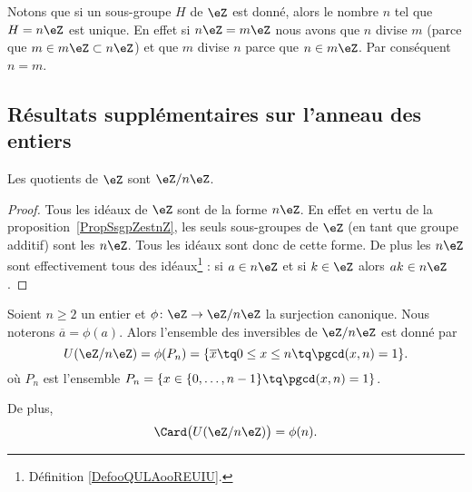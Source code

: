 Notons que si un sous-groupe \( H\) de \( \eZ\) est donné, alors le nombre \( n\) tel que \( H=n\eZ\) est unique. En effet si \( n\eZ=m\eZ\) nous avons que \( n\) divise \( m\) (parce que \( m\in m\eZ\subset n\eZ\)) et que \( m\) divise \( n\) parce que \( n\in m\eZ\). Par conséquent \( n=m\).

\subsection{Résultats supplémentaires sur l'anneau des entiers}

\begin{corollary}       \label{CORooLINXooBlUKPG}
    Les quotients de \( \eZ\) sont \( \eZ/n\eZ\).
\end{corollary}

\begin{proof}
    Tous les idéaux de \( \eZ\) sont de la forme \( n\eZ\). En effet en vertu de la proposition~\ref{PropSsgpZestnZ}, les seuls sous-groupes de \( \eZ\) (en tant que groupe additif) sont les \( n\eZ\). Tous les idéaux sont donc de cette forme. De plus les \( n\eZ\) sont effectivement tous des idéaux\footnote{Définition \ref{DefooQULAooREUIU}.} : si \( a\in n\eZ\) et si \( k\in \eZ\) alors \( ak\in n\eZ\).
\end{proof}

\begin{proposition}     \label{PropZpintssiprempUzn}
    Soient \( n\geq 2\) un entier et \( \phi\colon \eZ\to \eZ/n\eZ\) la surjection canonique. Nous noterons \( \overline a=\phi(a)\). Alors l'ensemble des inversibles de \( \eZ/n\eZ\) est donné par
    \begin{equation}
        U(\eZ/n\eZ)=\phi(P_n)=\{ \overline x\tq 0\leq x\leq n\tq\pgcd(x,n)=1 \}.
    \end{equation}
    où \( P_n\) est l'ensemble $P_n=\{ x\in\{ 0,\ldots,n-1 \}\tq\pgcd(x,n)=1 \}$.

    De plus,
    \begin{equation}
        \Card\big( U(\eZ/n\eZ) \big)=\phi(n).
    \end{equation}
\end{proposition}

